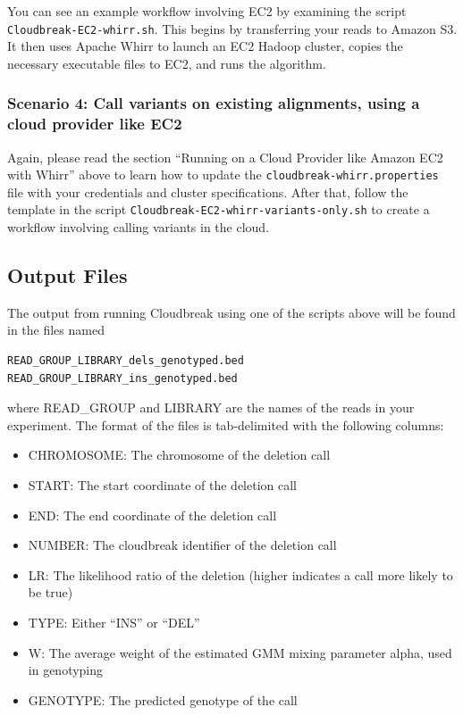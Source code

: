 \documentclass[11pt]{article}
\begin{document}
You can see an example workflow involving EC2 by examining the script
\texttt{Cloudbreak-EC2-whirr.sh}. This begins by transferring your reads to Amazon S3. It then
uses Apache Whirr to launch an EC2 Hadoop cluster, copies the necessary executable files
to EC2, and runs the algorithm.

\subsubsection{Scenario 4: Call variants on existing alignments, using a cloud provider like EC2}
\label{scenario4:callvariantsonexistingalignmentsusingacloudproviderlikeec2}

Again, please read the section ``Running on a Cloud Provider like Amazon EC2 with Whirr'' above to learn how to
update the \texttt{cloudbreak-whirr.properties} file with your credentials and cluster specifications. After that,
follow the template in the script \texttt{Cloudbreak-EC2-whirr-variants-only.sh} to create a workflow
involving calling variants in the cloud.

\subsection{Output Files}
\label{outputfiles}

The output from running Cloudbreak using one of the scripts above will be found in the files named

\begin{verbatim}
READ_GROUP_LIBRARY_dels_genotyped.bed
READ_GROUP_LIBRARY_ins_genotyped.bed
\end{verbatim}

where READ\_GROUP and LIBRARY are the names of the reads in your experiment. The
format of the files is tab-delimited with the following columns:

\begin{itemize}
\item CHROMOSOME: The chromosome of the deletion call

\item START: The start coordinate of the deletion call

\item END: The end coordinate of the deletion call

\item NUMBER: The cloudbreak identifier of the deletion call

\item LR: The likelihood ratio of the deletion (higher indicates a call more likely to be true)

\item TYPE: Either ``INS'' or ``DEL''

\item W: The average weight of the estimated GMM mixing parameter alpha, used in genotyping

\item GENOTYPE: The predicted genotype of the call

\end{itemize}
\end{document}
